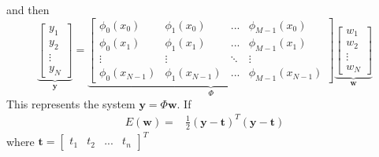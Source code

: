 \begin{frame}{\insertsubsection}
\end{frame}

\begin{frame}{\insertsubsection}
%
and then
%
\begin{equation*}
\underbrace{
\begin{bmatrix}
y_1 \\ y_2 \\  \vdots \\ y_N
\end{bmatrix}
}_\mathbf{y} = 
\underbrace{
\begin{bmatrix}
\phi_0(x_0) & \phi_1(x_0) & ... & \phi_{M-1}(x_0)   \\ 
\phi_0(x_1) & \phi_1(x_1) & ... & \phi_{M-1}(x_1)    \\ 
\vdots & \vdots & \ddots & \vdots \\
\phi_0(x_{N-1}) & \phi_1(x_{N-1}) & ... & \phi_{M-1}(x_{N-1})  
\end{bmatrix}
}_\Phi
\underbrace{
\begin{bmatrix}
w_1 \\ w_2 \\  \vdots \\ w_N
\end{bmatrix}
}_\mathbf{w}
\end{equation*}
This represents the system $\mathbf{y} = \Phi \mathbf{w}$. If
\begin{align*}
E(\mathbf{w}) =& \frac{1}{2} \left( \mathbf{y} - \mathbf{t} \right)^T\left( \mathbf{y} - \mathbf{t} \right)
\end{align*}
where $\mathbf{t} =
\begin{bmatrix}
t_1 & t_2 & ... & t_n
\end{bmatrix}^T
$
\end{frame}

